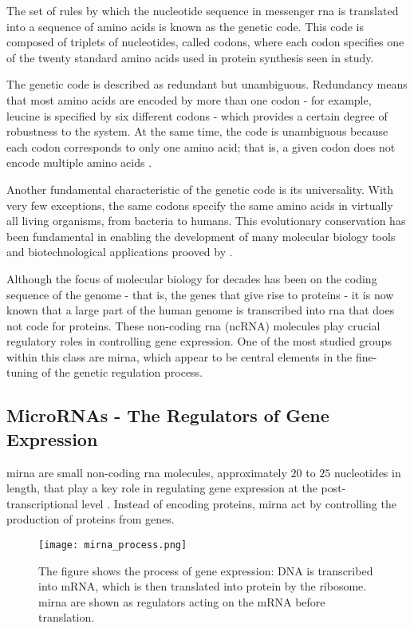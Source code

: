 The set of rules by which the nucleotide sequence in messenger \gls{rna} is
translated into a sequence of amino acids is known as the genetic code. This
code is composed of triplets of nucleotides, called codons, where each codon
specifies one of the twenty standard amino acids used in protein synthesis seen
in \textcite{genetic_codeNovozhilov2008O} study.

The genetic code is described as redundant but unambiguous. Redundancy means
that most amino acids are encoded by more than one codon - for example, leucine
is specified by six different codons - which provides a certain degree of
robustness to the system. At the same time, the code is unambiguous because
each codon corresponds to only one amino acid; that is, a given codon does not
encode multiple amino acids \cite{ConceptsBiology_DNA}.

Another fundamental characteristic of the genetic code is its universality.
With very few exceptions, the same codons specify the same amino acids in
virtually all living organisms, from bacteria to humans. This evolutionary
conservation has been fundamental in enabling the development of many molecular
biology tools and biotechnological applications prooved by
\textcite{genetic_codeKoonin2017}.

Although the focus of molecular biology for decades has been on the coding
sequence of the genome - that is, the genes that give rise to proteins - it is
now known that a large part of the human genome is transcribed into \gls{rna}
that does not code for proteins. These non-coding \gls{rna} (ncRNA) molecules
play crucial regulatory roles in controlling gene expression. One of the most
studied groups within this class are \gls{mirna}, which appear to be central
elements in the fine-tuning of the genetic regulation process.

\subsection{MicroRNAs - The Regulators of Gene Expression}
\label{sec:microRNA}
\gls{mirna} are small non-coding \gls{rna} molecules, approximately $20$
to $25$ nucleotides in length, that play a key role in regulating gene
expression at the post-transcriptional level
\cite{regulatory_mecha_mirnaGulyaeva2016,
  first_mirna_Ambros1993,post_transcript_wightman1993}. Instead of encoding
proteins, \gls{mirna} act by controlling the production of proteins from genes.

\begin{figure}[h]
  \centering
  \texttt{[image: mirna\_process.png]}
  \caption{The figure shows the process of gene expression: DNA is transcribed
    into mRNA, which is then translated into protein by the ribosome. \gls{mirna}
    are shown as regulators acting on the mRNA before translation.}
  \label{fig:mirna_mechanism}
\end{figure}

